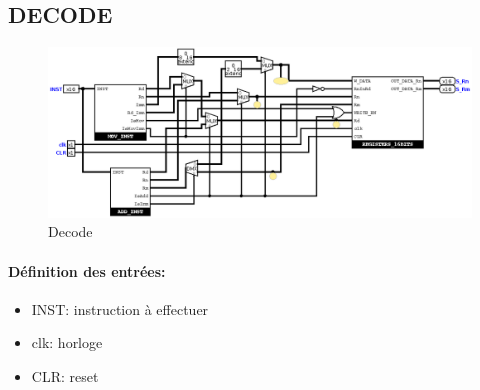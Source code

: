 \documentclass[a4paper]{article} %
\begin{document}
\subsection{DECODE}
\begin{figure}[H]
    \centering
    \includegraphics[width=1\textwidth]{src/DECODE.png}
    \caption{Decode}
    \label{decode_img}
\end{figure}

\paragraph{Définition des entrées:}
\begin{itemize}
    \item     INST: instruction à effectuer
    \item     clk: horloge
    \item     CLR: reset
\end{itemize}
\end{document}
